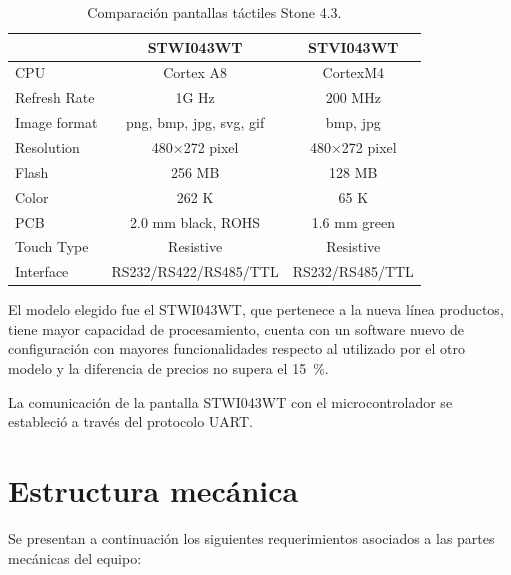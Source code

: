 \begin{table}[!ht]
	\centering
	\caption[Comparación Stone]{Comparación pantallas táctiles Stone 4.3.}
	\begin{tabular}{l c c }    
		\toprule
		\textbf{}     & \textbf{STWI043WT} & \textbf{STVI043WT} \\
		\midrule
		CPU 			& 	Cortex A8         		& 	CortexM4 			 	\\		
		Refresh Rate    & 	1G Hz         			& 	200 MHz 				\\
		Image format  	& 	png, bmp, jpg, svg, gif     & 	bmp, jpg 				\\
		Resolution		& 	480×272 pixel	        & 	480×272 pixel 			\\
		Flash  			& 	256 MB         			& 	128 MB 					\\
		Color  			& 	262 K	          		& 	65 K 					\\
		PCB 			& 	2.0 mm black, ROHS       & 	1.6 mm green 			\\
		Touch Type		& 	Resistive    			& 	Resistive				\\
		Interface 		& 	RS232/RS422/RS485/TTL   & 	RS232/RS485/TTL			\\
		\bottomrule
		\hline
	\end{tabular}
	\label{tab:tabla_stone}
\end{table}


El modelo elegido fue el STWI043WT, que pertenece a la nueva línea productos, tiene mayor capacidad de procesamiento, cuenta con un software nuevo de configuración con mayores funcionalidades respecto al utilizado por el otro modelo y la diferencia de precios no supera el \SI{15}{\percent}.  

La comunicación de la pantalla STWI043WT con el microcontrolador se estableció a través del protocolo UART.



\section{Estructura mecánica}
\label{sec:estructura_mecanica}

Se presentan a continuación los siguientes requerimientos asociados a las partes mecánicas del equipo: 


